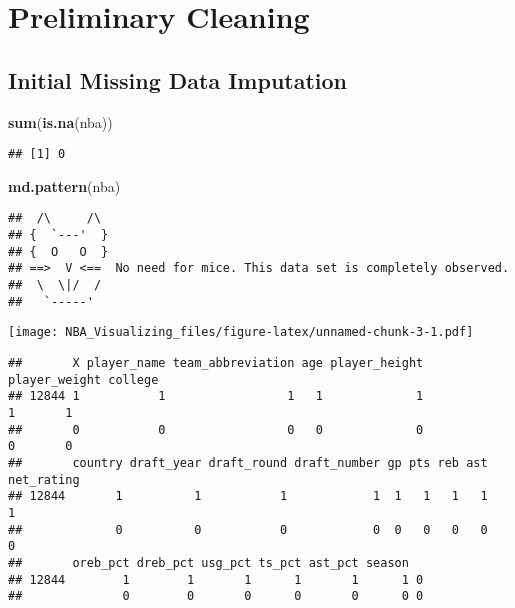 \documentclass[
]{book}
\newenvironment{Shaded}{\begin{snugshade}}{\end{snugshade}}
\newcommand{\FunctionTok}[1]{\textcolor[rgb]{0.13,0.29,0.53}{\textbf{#1}}}
\newcommand{\NormalTok}[1]{#1}
\begin{document}
\hypertarget{preliminary-cleaning}{%
\section{Preliminary Cleaning}\label{preliminary-cleaning}}

\hypertarget{initial-missing-data-imputation}{%
\subsection{Initial Missing Data Imputation}\label{initial-missing-data-imputation}}

\begin{Shaded}
\begin{Highlighting}[]
\FunctionTok{sum}\NormalTok{(}\FunctionTok{is.na}\NormalTok{(nba))}
\end{Highlighting}
\end{Shaded}

\begin{verbatim}
## [1] 0
\end{verbatim}

\begin{Shaded}
\begin{Highlighting}[]
\FunctionTok{md.pattern}\NormalTok{(nba)}
\end{Highlighting}
\end{Shaded}

\begin{verbatim}
##  /\     /\
## {  `---'  }
## {  O   O  }
## ==>  V <==  No need for mice. This data set is completely observed.
##  \  \|/  /
##   `-----'
\end{verbatim}

\texttt{[image: NBA\_Visualizing\_files/figure-latex/unnamed-chunk-3-1.pdf]}

\begin{verbatim}
##       X player_name team_abbreviation age player_height player_weight college
## 12844 1           1                 1   1             1             1       1
##       0           0                 0   0             0             0       0
##       country draft_year draft_round draft_number gp pts reb ast net_rating
## 12844       1          1           1            1  1   1   1   1          1
##             0          0           0            0  0   0   0   0          0
##       oreb_pct dreb_pct usg_pct ts_pct ast_pct season  
## 12844        1        1       1      1       1      1 0
##              0        0       0      0       0      0 0
\end{verbatim}
\end{document}
